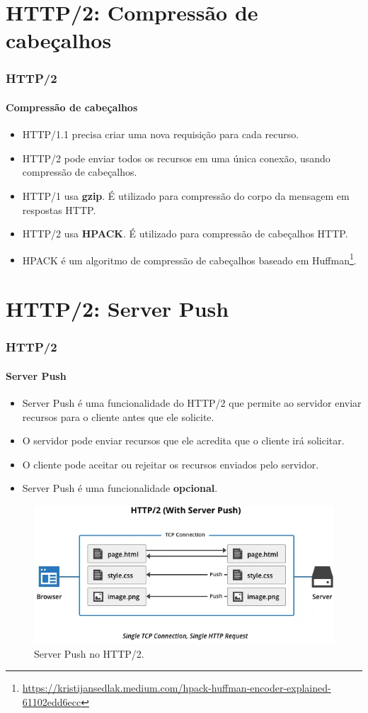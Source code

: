 \documentclass[
	9pt, %
	t, %
]{beamer}
\begin{document}
\section{HTTP/2: Compressão de cabeçalhos}

\begin{frame}
	\frametitle{HTTP/2}
	\framesubtitle{Compressão de cabeçalhos}

	\begin{itemize}
		\item HTTP/1.1 precisa criar uma nova requisição para cada recurso.
		\item HTTP/2 pode enviar todos os recursos em uma única conexão, usando compressão de cabeçalhos.
		\item HTTP/1 usa \textbf{gzip}. É utilizado para compressão do corpo da mensagem em respostas HTTP.
		\item HTTP/2 usa \textbf{HPACK}. É utilizado para compressão de cabeçalhos HTTP.
		\item HPACK é um algoritmo de compressão de cabeçalhos baseado em Huffman\footnote{\href{https://kristijansedlak.medium.com/hpack-huffman-encoder-explained-61102edd6ecc}{https://kristijansedlak.medium.com/hpack-huffman-encoder-explained-61102edd6ecc}}.
	\end{itemize}

\end{frame}

\section{HTTP/2: Server Push}

\begin{frame}
	\frametitle{HTTP/2}
	\framesubtitle{Server Push}

	\begin{itemize}
		\item Server Push é uma funcionalidade do HTTP/2 que permite ao servidor enviar recursos para o cliente antes que ele solicite.
		\item O servidor pode enviar recursos que ele acredita que o cliente irá solicitar.
		\item O cliente pode aceitar ou rejeitar os recursos enviados pelo servidor.
		\item Server Push é uma funcionalidade \textbf{opcional}.
	\end{itemize}

	\begin{figure}
		\centering
		\includegraphics[width=0.7\linewidth]{http2_server_push.png}
		\caption{Server Push no HTTP/2.}
	\end{figure}

\end{frame}
\end{document}
